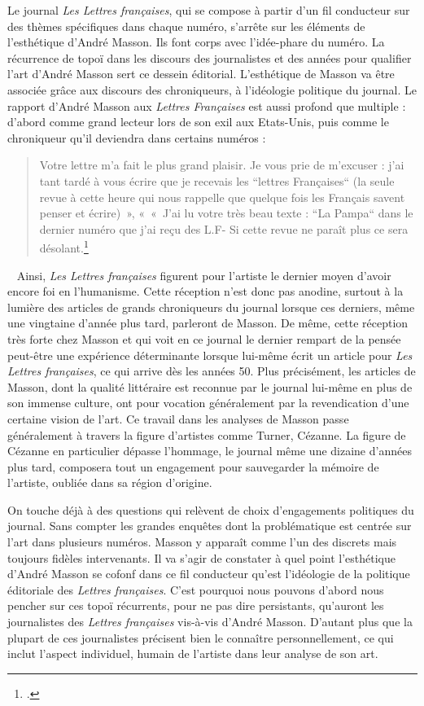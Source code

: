 Le journal \emph{Les Lettres françaises}, qui se compose à partir d’un fil conducteur sur des thèmes spécifiques dans chaque numéro, s’arrête  sur les éléments de l’esthétique d’André Masson.  Ils font corps avec l’idée-phare du numéro.  La récurrence de topoï dans les discours des journalistes et des années pour qualifier l’art d’André Masson sert ce dessein éditorial. L’esthétique de Masson va être associée grâce aux discours des chroniqueurs, à l’idéologie politique du journal. Le rapport d’André Masson aux \emph{Lettres Françaises} est aussi profond que multiple : d’abord comme grand lecteur lors de son exil aux Etats-Unis, puis comme le chroniqueur qu'il deviendra dans certains numéros : 

\begin{quote}
Votre lettre m’a fait le plus grand plaisir. Je vous prie de m’excuser : j’ai tant tardé à vous écrire que je recevais les “lettres Françaises“ (la seule revue à cette heure qui nous rappelle que quelque fois les Français savent penser et écrire) », « « J’ai lu votre très beau texte : “La Pampa“ dans le dernier numéro que j’ai reçu des L.F- Si cette revue ne paraît plus ce sera désolant.\footcite[p478]{anneessurrealistes}\end{quote}
 
	Ainsi, \emph{Les Lettres françaises }figurent pour l’artiste le dernier moyen d’avoir encore foi en l’humanisme. Cette réception n’est donc pas anodine, surtout à la lumière des articles de grands chroniqueurs du journal lorsque ces derniers, même une vingtaine d’année plus tard, parleront de Masson. De même, cette réception très forte chez Masson et qui voit en ce journal le dernier rempart de la pensée peut-être une expérience déterminante lorsque lui-même écrit un article pour \emph{Les Lettres françaises}, ce qui arrive dès les années 50. Plus précisément, les articles de Masson, dont la qualité littéraire est reconnue par le journal lui-même en plus de son immense culture, ont pour vocation généralement par la revendication d’une certaine vision de l’art. Ce travail dans les analyses de Masson passe généralement à travers la figure d’artistes comme Turner, Cézanne. La figure de Cézanne en particulier dépasse l’hommage, le journal même une dizaine d’années plus tard, composera tout un engagement pour sauvegarder la mémoire de l’artiste, oubliée dans sa région d’origine. 


On touche déjà à des questions qui relèvent de choix d’engagements politiques du journal. Sans compter les grandes enquêtes dont la problématique est centrée sur l’art dans plusieurs numéros. Masson y apparaît comme l’un des discrets mais toujours fidèles intervenants. Il va s’agir de constater à quel point l’esthétique d’André Masson se cofonf dans ce fil conducteur qu'est l’idéologie de la politique éditoriale des \emph{Lettres françaises}. C’est pourquoi nous pouvons d’abord nous pencher sur ces topoï récurrents, pour ne pas dire persistants, qu’auront les journalistes des \emph{Lettres françaises} vis-à-vis d’André Masson. D’autant plus que la plupart de ces journalistes précisent bien le connaître personnellement, ce qui inclut l’aspect individuel, humain de l’artiste dans leur analyse de son art.

